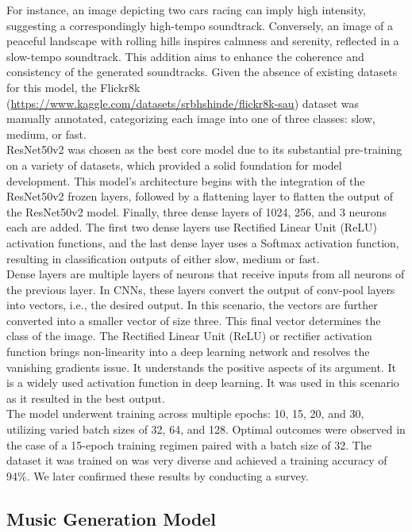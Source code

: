 \documentclass[conference]{IEEEtran}
\begin{document}
For instance, an image depicting two cars racing can imply high intensity, suggesting a correspondingly high-tempo soundtrack. Conversely, an image of a peaceful landscape with rolling hills inspires calmness and serenity, reflected in a slow-tempo soundtrack. This addition aims to enhance the coherence and consistency of the generated soundtracks. Given the absence of existing datasets for this model, the Flickr8k (\url{https://www.kaggle.com/datasets/srbhshinde/flickr8k-sau}) dataset was manually annotated, categorizing each image into one of three classes: slow, medium, or fast.
\\

ResNet50v2 was chosen as the best core model due to its substantial pre-training on a variety of datasets, which provided a solid foundation for model development.
This model's architecture begins with the integration of the ResNet50v2 frozen layers, followed by a flattening layer to flatten the output of the ResNet50v2 model.
Finally, three dense layers of 1024, 256, and 3 neurons each are added. The first two dense layers use Rectified Linear Unit (ReLU) activation functions, and the last dense layer uses a Softmax activation function, resulting in classification outputs of either slow, medium or fast.
\\

Dense layers are multiple layers of neurons that receive inputs from all neurons of the previous layer. In CNNs, these layers convert the output of conv-pool layers into vectors, i.e., the desired output. In this scenario, the vectors are further converted into a smaller vector of size three. This final vector determines the class of the image.
The Rectified Linear Unit (ReLU) or rectifier activation function brings non-linearity into a deep learning network and resolves the vanishing gradients issue. It understands the positive aspects of its argument. It is a widely used activation function in deep learning. It was used in this scenario as it resulted in the best output.
\\

The model underwent training across multiple epochs: 10, 15, 20, and 30, utilizing varied batch sizes of 32, 64, and 128. Optimal outcomes were observed in the case of a 15-epoch training regimen paired with a batch size of 32. The dataset it was trained on was very diverse and achieved a training accuracy of 94\%. We later confirmed these results by conducting a survey.

\subsection{Music Generation Model}
\end{document}

